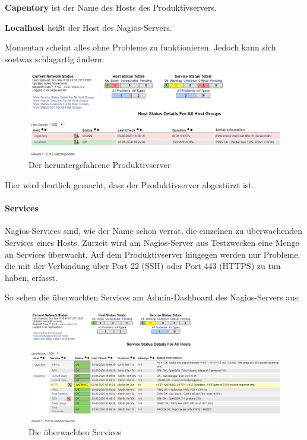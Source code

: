 \textbf{Capentory} ist der Name des Hosts des Produktivservers.

\textbf{Localhost} heißt der Host des Nagios-Servers.

Momentan scheint alles ohne Probleme zu funktionieren. Jedoch kann sich
soetwas schlagartig ändern:

\begin{figure}[ht]
\centering
\includegraphics{dedprod.png}
\caption{Der heruntergefahrene Produktivserver}
\end{figure}

Hier wird deutlich gemacht, dass der Produktivserver abgestürzt ist.

\hypertarget{services}{%
\paragraph{Services}\label{services}}

Nagios-Services sind, wie der Name schon verrät, die einzelnen zu
überwachenden Services eines Hosts. Zurzeit wird am Nagios-Server aus
Testzwecken eine Menge an Services überwacht. Auf dem Produktivserver
hingegen werden nur Probleme, die mit der Verbindung über Port 22 (SSH)
oder Port 443 (HTTPS) zu tun haben, erfasst.

So sehen die überwachten Services am Admin-Dashboard des Nagios-Servers
aus:

\begin{figure}[ht]
\centering
\includegraphics{services.png}
\caption{Die überwachten Services}
\end{figure}

